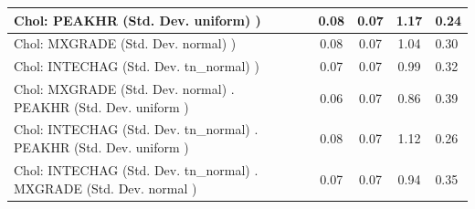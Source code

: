 \begin{table}
\begin{center}
\begin{tabular}{|l|l|c|c|c|l|}
			\hline
			 Chol: PEAKHR (Std. Dev. uniform) ) &  & 0.08 & 0.07 & 1.17 & 0.24 \\
			\hline
			 Chol: MXGRADE (Std. Dev. normal) ) &  & 0.08 & 0.07 & 1.04 & 0.30 \\
			\hline
			 Chol: INTECHAG (Std. Dev. tn_normal) ) &  & 0.07 & 0.07 & 0.99 & 0.32 \\
			\hline
			 Chol: MXGRADE (Std. Dev. normal) . PEAKHR (Std. Dev.   uniform ) &  & 0.06 & 0.07 & 0.86 & 0.39 \\
			\hline
			 Chol: INTECHAG (Std. Dev. tn_normal) . PEAKHR (Std. Dev.   uniform ) &  & 0.08 & 0.07 & 1.12 & 0.26 \\
			\hline
			 Chol: INTECHAG (Std. Dev. tn_normal) . MXGRADE (Std. Dev.   normal ) &  & 0.07 & 0.07 & 0.94 & 0.35 \\
			\hline
		\end{tabular}
	\end{center}
\end{table}